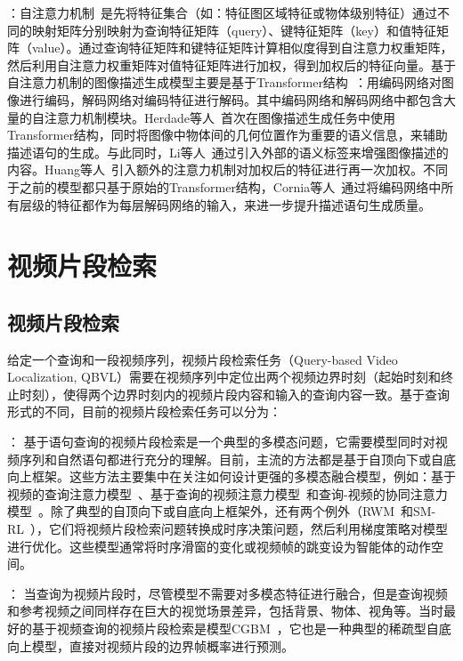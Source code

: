 \textbf{}：自注意力机制~\cite{vaswani2017attention}是先将特征集合（如：特征图区域特征或物体级别特征）通过不同的映射矩阵分别映射为查询特征矩阵（query）、键特征矩阵（key）和值特征矩阵（value）。通过查询特征矩阵和键特征矩阵计算相似度得到自注意力权重矩阵，然后利用自注意力权重矩阵对值特征矩阵进行加权，得到加权后的特征向量。基于自注意力机制的图像描述生成模型主要是基于Transformer结构~\cite{vaswani2017attention}：用编码网络对图像进行编码，解码网络对编码特征进行解码。其中编码网络和解码网络中都包含大量的自注意力机制模块。Herdade等人~\cite{herdade2019image}首次在图像描述生成任务中使用Transformer结构，同时将图像中物体间的几何位置作为重要的语义信息，来辅助描述语句的生成。与此同时，Li等人~\cite{li2019entangled}通过引入外部的语义标签来增强图像描述的内容。Huang等人~\cite{huang2019attention}引入额外的注意力机制对加权后的特征进行再一次加权。不同于之前的模型都只基于原始的Transformer结构，Cornia等人~\cite{cornia2020m}通过将编码网络中所有层级的特征都作为每层解码网络的输入，来进一步提升描述语句生成质量。


\section{视频片段检索}

\subsection{视频片段检索}

给定一个查询和一段视频序列，视频片段检索任务（Query-based Video Localization, QBVL）需要在视频序列中定位出两个视频边界时刻（起始时刻和终止时刻），使得两个边界时刻内的视频片段内容和输入的查询内容一致。基于查询形式的不同，目前的视频片段检索任务可以分为：

\textbf{}：
基于语句查询的视频片段检索是一个典型的多模态问题，它需要模型同时对视频序列和自然语句都进行充分的理解。目前，主流的方法都是基于自顶向下或自底向上框架。这些方法主要集中在关注如何设计更强的多模态融合模型，例如：基于视频的查询注意力模型~\cite{liu2018attentive}、基于查询的视频注意力模型~\cite{liu2018cross}和查询-视频的协同注意力模型~\cite{chen2018temporally,chen2019localizing,yuan2019find}。除了典型的自顶向下或自底向上框架外，还有两个例外（RWM~\cite{he2019read}和SM-RL~\cite{wang2019language}），它们将视频片段检索问题转换成时序决策问题，然后利用梯度策略对模型进行优化。这些模型通常将时序滑窗的变化或视频帧的跳变设为智能体的动作空间。

\textbf{}：
当查询为视频片段时，尽管模型不需要对多模态特征进行融合，但是查询视频和参考视频之间同样存在巨大的视觉场景差异，包括背景、物体、视角等。当时最好的基于视频查询的视频片段检索是模型CGBM~\cite{feng2018video}，它也是一种典型的稀疏型自底向上模型，直接对视频片段的边界帧概率进行预测。


